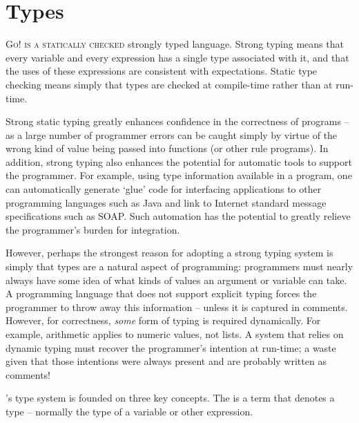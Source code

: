 \chapter{Types}
\label{types}

\lettrine[nindent=0.1em]{G}{o! is a statically checked} strongly typed language. Strong typing means that every variable and every expression has a single type associated with it, and that the uses of these expressions are consistent with expectations. Static type checking means simply that types are checked at compile-time rather than at run-time.

Strong static typing greatly enhances confidence in the correctness of programs -- as a large number of programmer errors can be caught simply by virtue of the wrong kind of value being passed into functions (or other rule programs). In addition, strong typing also enhances the potential for automatic tools to support the \go programmer. For example, using type information available in a \go program, one can automatically generate `glue' code for interfacing \go applications to other programming languages such as Java and link to Internet standard message specifications such as SOAP. Such automation has the potential to greatly relieve the programmer's burden for integration.

However, perhaps the strongest reason for adopting a strong typing system is simply that types are a natural aspect of programming: programmers must nearly always have some idea of what kinds of values an argument or variable can take. A programming language that does not support explicit typing forces the programmer to throw away this information -- unless it is captured in comments. However, for correctness, \emph{some} form of typing is required dynamically. For example, arithmetic applies to numeric values, not lists. A system that relies on dynamic typing must recover the programmer's intention at run-time; a waste given that those intentions were always present and are probably written as comments!

\go's type system is founded on three key concepts. The  is a term that denotes a type -- normally the type of a variable or other expression.

